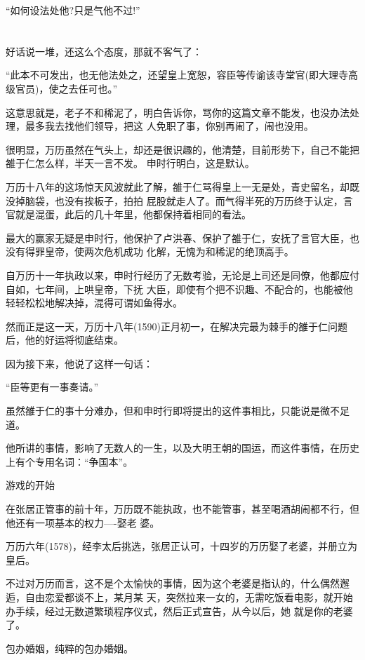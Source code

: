 \documentclass[11pt,a4paper,onecolumn]{article}
\begin{document}
``如何设法处他?只是气他不过!''

\section[\thesection]{}

好话说一堆，还这么个态度，那就不客气了：

``此本不可发出，也无他法处之，还望皇上宽恕，容臣等传谕该寺堂官(即大理寺高级官员)，使之去任可也。''

这意思就是，老子不和稀泥了，明白告诉你，骂你的这篇文章不能发，也没办法处理，最多我去找他们领导，把这
人免职了事，你别再闹了，闹也没用。

很明显，万历虽然在气头上，却还是很识趣的，他清楚，目前形势下，自己不能把雒于仁怎么样，半天一言不发。
申时行明白，这是默认。

万历十八年的这场惊天风波就此了解，雒于仁骂得皇上一无是处，青史留名，却既没掉脑袋，也没有挨板子，拍拍
屁股就走人了。而气得半死的万历终于认定，言官就是混蛋，此后的几十年里，他都保持着相同的看法。

最大的赢家无疑是申时行，他保护了卢洪春、保护了雒于仁，安抚了言官大臣，也没有得罪皇帝，使两次危机成功
化解，无愧为和稀泥的绝顶高手。

自万历十一年执政以来，申时行经历了无数考验，无论是上司还是同僚，他都应付自如，七年间，上哄皇帝，下抚
大臣，即使有个把不识趣、不配合的，也能被他轻轻松松地解决掉，混得可谓如鱼得水。

然而正是这一天，万历十八年(1590)正月初一，在解决完最为棘手的雒于仁问题后，他的好运将彻底结束。

因为接下来，他说了这样一句话：

``臣等更有一事奏请。''

虽然雒于仁的事十分难办，但和申时行即将提出的这件事相比，只能说是微不足道。

他所讲的事情，影响了无数人的一生，以及大明王朝的国运，而这件事情，在历史上有个专用名词：``争国本''。

游戏的开始

在张居正管事的前十年，万历既不能执政，也不能管事，甚至喝酒胡闹都不行，但他还有一项基本的权力----娶老
婆。

万历六年(1578)，经李太后挑选，张居正认可，十四岁的万历娶了老婆，并册立为皇后。

不过对万历而言，这不是个太愉快的事情，因为这个老婆是指认的，什么偶然邂逅，自由恋爱都谈不上，某月某
天，突然拉来一女的，无需吃饭看电影，就开始办手续，经过无数道繁琐程序仪式，然后正式宣告，从今以后，她
就是你的老婆了。

包办婚姻，纯粹的包办婚姻。
\end{document}
